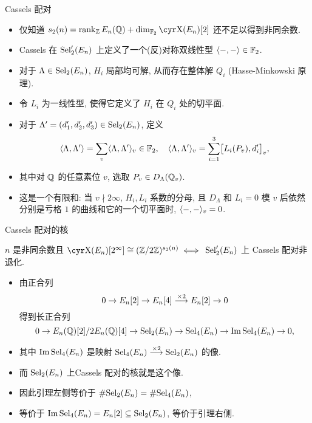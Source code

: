 \documentclass[aspectratio=169]{ctexbeamer}
\begin{document}
\begin{frame}{Cassels 配对}
	\begin{itemize}
		\item 仅知道 $s_2(n)=\rank_\BZ E_n(\BQ)+\dim_{\BF_2}\Sha(E_n)[2]$ 还不足以得到非同余数.
		\item Cassels 在 ${\mathrm{Sel}}_2'(E_n)$ 上定义了一个(反)对称双线性型 $\langle{-,-}\rangle\in{\mathbb{F}}_2$.
		\item 对于 $\Lambda\in{\mathrm{Sel}}_2(E_n)$, $H_i$ 局部均可解, 从而存在整体解 $Q_i$ (Hasse-Minkowski 原理).
		\item 令 $L_i$ 为一线性型, 使得它定义了 $H_i$ 在 $Q_i$ 处的切平面.
		\item 对于 $\Lambda'=(d'_1,d'_2,d'_3)\in{\mathrm{Sel}}_2(E_n)$, 定义
		\[
			\langle{\Lambda,\Lambda'}\rangle=\sum_v\langle{\Lambda,\Lambda'}\rangle_v\in{\mathbb{F}}_2,
			\quad
			\langle{\Lambda,\Lambda'}\rangle_v
			=\sum_{i=1}^3 \bigl[L_i(P_v),d_i'\bigr]_v,
		\]
		\item 其中对 ${\mathbb{Q}}$ 的任意素位 $v$, 选取 $P_v\in D_\Lambda({\mathbb{Q}}_v)$.
		\item 这是一个有限和: 当 $v\nmid 2\infty$, $H_i,L_i$ 系数的分母, 且 $D_\Lambda$ 和 $L_i=0$ 模 $v$ 后依然分别是亏格 $1$ 的曲线和它的一个切平面时, $\langle{-,-}\rangle_v=0$.
	\end{itemize}
\end{frame}


\begin{frame}{Cassels 配对的核}
	\onslide<+->
	\begin{lemma}[Wang2016]
		$n$ 是非同余数且 $\Sha(E_n)[2^\infty]\cong(\BZ/2\BZ)^{s_2(n)}\iff$
		${\mathrm{Sel}}_2'(E_n)$ 上 Cassels 配对非退化.
	\end{lemma}
	\begin{itemize}
		\item 由正合列
		\[
			0\rightarrow E_n[2]\rightarrow E_n[4] \stackrel{\times 2}{\longrightarrow} E_n[2]\rightarrow 0
		\]
		得到长正合列
		\[
			0\rightarrow {E_n({\mathbb{Q}})[2]}/{2E_n({\mathbb{Q}})[4]}\rightarrow {\mathrm{Sel}}_2(E_n)\rightarrow {\mathrm{Sel}}_4(E_n)\rightarrow \operatorname{Im} {\mathrm{Sel}}_4(E_n)\rightarrow 0,
		\]
		\item 其中 $\operatorname{Im} {\mathrm{Sel}}_4(E_n)$ 是映射 ${\mathrm{Sel}}_4(E_n)\stackrel{\times 2}{\longrightarrow} {\mathrm{Sel}}_2(E_n)$ 的像.
		\item 而 ${\mathrm{Sel}}_2(E_n)$ 上Cassels 配对的核就是这个像.
		\item 因此引理左侧等价于 $\#{\mathrm{Sel}}_2(E_n) = \#{\mathrm{Sel}}_4(E_n)$, 
		\item 等价于 $\operatorname{Im} {\mathrm{Sel}}_4(E_n)=E_n[2]\subseteq {\mathrm{Sel}}_2(E_n)$, 等价于引理右侧.
	\end{itemize}
\end{frame}
\end{document}
